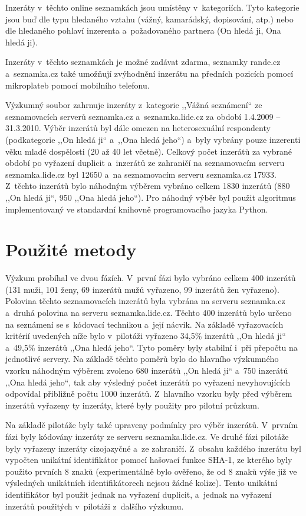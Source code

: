 \documentclass[a4paper, 12pt, notitlepage, oneside, numbers=noenddot]{report}
\begin{document}
Inzeráty v~těchto online seznamkách jsou umístěny v~kategoriích. Tyto
kategorie jsou buď dle typu hledaného vztahu (vážný, kamarádský,
dopisování, atp.) nebo dle hledaného pohlaví inzerenta a~požadovaného
partnera (On hledá ji, Ona hledá ji).

Inzeráty v~těchto seznamkách je možné zadávat zdarma, seznamky
rande.cz a~seznamka.cz také umožňují zvýhodnění inzerátu na předních
pozicích pomocí mikroplateb pomocí mobilního telefonu.

Výzkumný soubor zahrnuje inzeráty z~kategorie ,,Vážná seznámení`` ze
seznamovacích serverů seznamka.cz a~seznamka.lide.cz za období
1.4.2009 -- 31.3.2010.  Výběr in\-ze\-rá\-tů byl dále omezen na
heterosexuální respondenty (podkategorie ,,On hledá ji`` a~,,Ona hledá
jeho``) a~byly vybrány pouze inzerenti věku mladé dospělosti (20 až 40
let včetně).  Celkový počet inzerátů za vybrané období po vyřazení
duplicit a~inzerátů ze zahraničí na seznamovacím serveru
seznamka.lide.cz byl 12650 a~na seznamovacím serveru seznamka.cz
17933.  Z~těchto inzerátů bylo náhodným výběrem vybráno celkem 1830
inzerátů (880 ,,On hledá ji``, 950 ,,Ona hledá jeho``). Pro náhodný
výběr byl použit algoritmus \citet{WichmannHill1982} implementovaný ve
standardní knihovně programovacího jazyka Python.

\section{Použité metody}
Výzkum probíhal ve dvou fázích. V~první fázi bylo vybráno celkem 400
inzerátů (131 muži, 101 ženy, 69 inzerátů mužů vyřazeno, 99 inzerátů
žen vyřazeno). Polovina těchto seznamovacích inzerátů byla vybrána na
serveru seznamka.cz a~druhá polovina na serveru
seznamka.lide.cz. Těchto 400 inzerátů bylo určeno na seznámení se
s~kódovací technikou a~její nácvik. Na základě vyřazovacích kritérií
uvedených níže bylo v~pilotáži vyřazeno 34,5\% inzerátů ,,On hledá
ji`` a~49,5\% inzerátů ,,Ona hledá jeho``. Tyto poměry byly stabilní
i~při přepočtu na jednotlivé servery. Na základě těchto poměrů bylo do
hlavního výzkumného vzorku náhodným výběrem zvoleno 680 inzerátů ,,On
hledá ji`` a~750 inzerátů ,,Ona hledá jeho``, tak aby výsledný počet
inzerátů po vyřazení nevyhovujících odpovídal přibližně počtu 1000
inzerátů. Z~hlavního vzorku byly před výběrem inzerátů vyřazeny ty
inzeráty, které byly použity pro pilotní průzkum.

Na základě pilotáže byly také upraveny podmínky pro výběr
inzerátů. V~prvním fázi byly kódovány inzeráty ze serveru
seznamka.lide.cz. Ve druhé fázi pilotáže byly vyřazeny inzeráty
cizojazyčné a~ze zahraničí. Z~obsahu každého inzerátu byl vypočten
unikátní identifikátor pomocí hašovací funkce SHA-1, ze kterého byly
použito prvních 8 znaků (experimentálně bylo ověřeno, že od 8 znaků
výše již ve výsledných unikátních identifikátorech nejsou žádné
kolize). Tento unikátní identifikátor byl použit jednak na vyřazení
duplicit, a~jednak na vyřazení inzerátů použitých v~pilotáži z~dalšího
výzkumu.
\end{document}
